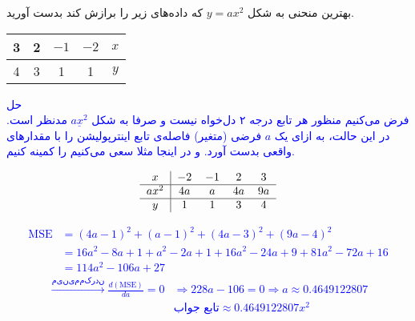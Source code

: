 بهترین منحنی به شکل 
$y = ax^2$
که داده‌های زیر را برازش کند بدست آورید.
	\begin{center}
		\begin{tabular}{c | c | c | c | c }
			3 & 2 & $-1$ & $-2$ & $x$ \\
			\hline
			4 & 3 & 1 & 1 & $y$ 
			
		\end{tabular}
	\end{center}
\textcolor{blue}{
حل
\\
فرض می‌کنیم منظور هر تابع درجه ۲ دل‌خواه نیست و صرفا به شکل 
$\underline{ax^2}$
مدنظر است.
در این حالت، به ازای یک 
$a$
فرضی (متغیر) فاصله‌ی تابع اینترپولیشن را با مقدار‌های واقعی بدست آورد. و در اینجا مثلا سعی می‌کنیم
را کمینه کنیم.
\begin{latin}
    \begin{align*}
        \begin{tabular}{ c|cccc } 
         $x$ & $-2$ & $-1$ & $2$ & $3$ \\
         \hline
         $ax^2$ & $4a$ & $a$ & $4a$ & $9a$ \\
         \hline
         $y$ & $1$ & $1$ & $3$ & $4$ \\
        \end{tabular}
    \end{align*}
\end{latin}
\begin{align*}
    \text{MSE} &= (4a - 1)^2 + (a - 1)^2 + (4a - 3)^2 + (9a - 4)^2 \\
    &= 16a^2 - 8a + 1 + a^2 - 2a + 1 + 16 a^2 - 24a + 9 + 81a^2 - 72a + 16 \\
    &= 114 a^2 - 106a + 27
\end{align*}
\begin{align*}
    \xrightarrow{می‌نیمم کردن}
    \frac{d (\text{MSE})}{da} = 0 &\Rightarrow 228a - 106 = 0 \Rightarrow a \approx 0.4649122807 \\
    &\text{تابع جواب} \approx 0.4649122807 x^2
\end{align*}
}
